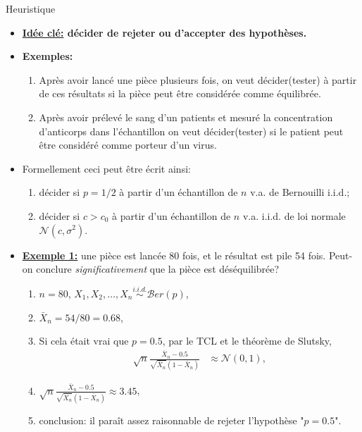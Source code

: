 \begin{frame}[allowframebreaks]{Heuristique}
    \begin{itemize}
        \item \textbf{\underline{Idée clé:} décider de rejeter ou d'accepter des hypothèses.}
        \item \textbf{Exemples:}
        \begin{enumerate}[-]
            \item Après avoir lancé une pièce plusieurs fois, on veut décider(tester) à partir de ces résultats si 
            la pièce peut être considérée comme équilibrée.
            \item Après avoir prélevé le sang d'un patients et mesuré la concentration d'anticorps dans l'échantillon on veut décider(tester)
            si le patient peut être considéré comme porteur d'un virus.
        \end{enumerate}
        \item Formellement ceci peut être écrit ainsi:
        \begin{enumerate}[-]
            \item décider si $p = 1/2$ à partir d'un échantillon de $n$ v.a. de Bernouilli i.i.d.;
            \item décider si $c> c_0$ à partir d'un échantillon de $n$ v.a. i.i.d. de loi normale $\mathcal{N}(c, \sigma^2)$.
        \end{enumerate}
        \framebreak
        \item \textbf{\underline{Exemple 1:}} une pièce est lancée 80 fois, et le résultat est pile 54 fois. 
        Peut-on conclure \emph{significativement} que la pièce est déséquilibrée? \begin{enumerate}[-]
            \item $n = 80$, $X_1, X_2, \ldots, X_n \overset{i.i.d.}{\sim}\mathcal{B}er(p)$,
            \item $\bar{X}_n = 54/80 = 0.68$,
            \item Si cela était vrai que $p = 0.5$, par le TCL et le théorème de Slutsky,\begin{align*}
                \sqrt{n}\frac{\bar{X}_n - 0.5}{\sqrt{\bar{X}_n}(1-\bar{X}_n)} &\approx\mathcal{N}(0, 1),
            \end{align*}
            \item $\sqrt{n}\frac{\bar{X}_n - 0.5}{\sqrt{\bar{X}_n}(1-\bar{X}_n)} \approx 3.45$,
            \item conclusion: il paraît assez raisonnable de rejeter l'hypothèse "$p = 0.5$".

\end{enumerate}
\end{itemize}
\end{frame}
